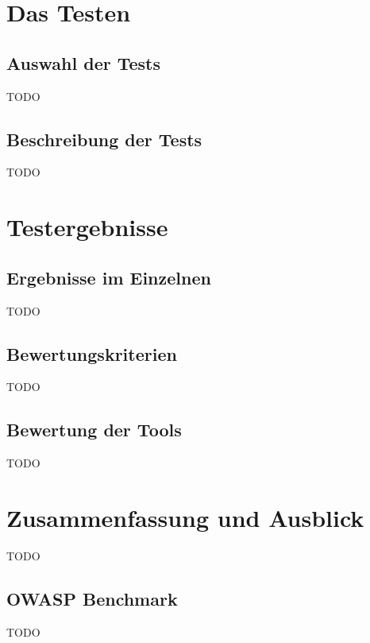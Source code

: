 \documentclass[12pt,oneside,a4paper,parskip]{scrbook}
\begin{document}
\chapter{Das Testen}
  \section{Auswahl der Tests}
  TODO
  \section{Beschreibung der Tests}
  TODO

\chapter{Testergebnisse}
  \section{Ergebnisse im Einzelnen}
  TODO
  \section{Bewertungskriterien}
  TODO
  \section{Bewertung der Tools}
  TODO

\chapter{Zusammenfassung und Ausblick}
TODO
  \section{OWASP Benchmark}
  TODO


\backmatter

\listoffigures
{}

\listoftables
{}


\cleardoublepage
{}
{}
\printbibliography[title=Quellenverzeichnis]
\end{document}
